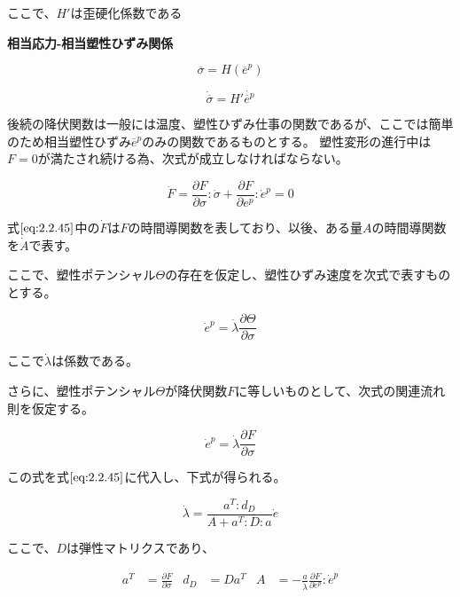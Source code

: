 \documentclass[a4paper,pandoc,ja=standard]{bxjsarticle}
\begin{document}
ここで、\(H'\)は歪硬化係数である

\textbf{相当応力-相当塑性ひずみ関係}

\begin{equation}
\overline{\sigma} = H(\overline{e}^p)
\label{eq:2.2.43}
\end{equation}

\begin{equation}
\dot{\overline{\sigma}} = H' \dot{\overline{e}^p}
\label{eq:2.2.44}
\end{equation}

後続の降伏関数は一般には温度、塑性ひずみ仕事の関数であるが、ここでは簡単のため相当塑性ひずみ\(\overline{e}^p\)のみの関数であるものとする。
塑性変形の進行中は\(F=0\)が満たされ続ける為、次式が成立しなければならない。

\begin{equation}
\dot{F} = \frac{\partial F}{\partial \sigma} : \dot{\sigma} + \frac{\partial F}{\partial e^p} : \dot{e}^p = 0
\label{eq:2.2.45}
\end{equation}

式\(\eqref{eq:2.2.45}\)中の\(\dot{F}\)は\(F\)の時間導関数を表しており、以後、ある量\(A\)の時間導関数を\(\dot{A}\)で表す。

ここで、塑性ポテンシャル\(\Theta\)の存在を仮定し、塑性ひずみ速度を次式で表すものとする。

\begin{equation}
\dot{e}^p=\dot{\lambda}\frac{\partial \Theta}{\partial \sigma}
\label{eq:2.2.46}
\end{equation}

ここで\(\dot{\lambda}\)は係数である。

さらに、塑性ポテンシャル\(\Theta\)が降伏関数\(F\)に等しいものとして、次式の関連流れ則を仮定する。

\begin{equation}
\dot{e}^p = \dot{\lambda} \frac{\partial F}{\partial \sigma}
\label{eq:2.2.47}
\end{equation}

この式を式\(\eqref{eq:2.2.45}\)に代入し、下式が得られる。

\begin{equation}
\dot{\lambda} = \frac{a^T : d_D }{A + a^T : D : a}\dot{e}
\label{eq:2.2.48}
\end{equation}

ここで、\(D\)は弾性マトリクスであり、

\begin{align}
  a^T &= \frac{\partial F}{\partial \sigma}
& d_D &= D a^T
&   A &= -\frac{ a }{\dot{\lambda}} \frac{\partial F}{\partial e^p} : \dot{e}^p
\label{eq:2.2.49}
\end{align}
\end{document}

